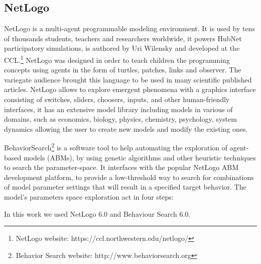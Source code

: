 \documentclass[11pt,a4paper]{article}
\begin{document}
\subsection{NetLogo}
\begin{figure}[h!]
\centering
\end{figure}
NetLogo is a multi-agent programmable modeling environment. 
It is used by tens of thousands students, teachers and researchers worldwide, it powers HubNet participatory simulations, is authored by Uri Wilensky and developed at the CCL.\footnote{NetLogo website: https://ccl.northwestern.edu/netlogo/} 
NetLogo was designed in order to teach children the programming concepts using agents in the form of turtles, patches, links and observer. 
The variegate audience brought this language to be used in many scientific published articles.
NetLogo allows to explore emergent phenomena with a graphics interface consisting of switches, sliders, choosers, inputs, and other human-friendly interfaces, it has an extensive model library including models in various of domains, such as economics, biology, physics, chemistry, psychology, system dynamics allowing the user to create new models and modify the existing ones. 

BehaviorSearch\footnote{Behavior Search website: http://www.behaviorsearch.org} is a software tool to help automating the exploration of agent-based models (ABMs), by using genetic algorithms and other heuristic techniques to search the parameter-space. 
It interfaces with the popular NetLogo ABM development platform, to provide a low-threshold way to search for combinations of model parameter settings that will result in a specified target behavior. 
The model's parameters space exploration act in four steps:
\begin{center}
 \end{center}
\bigskip
In this work we used NetLogo 6.0 and Behaviour Search 6.0.
\end{document}
